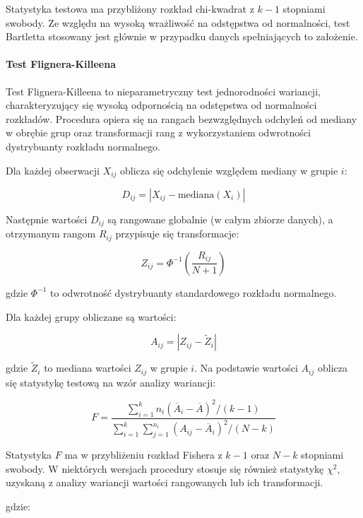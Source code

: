 \documentclass[12pt,a4paper]{article}
\begin{document}
Statystyka testowa ma przybliżony rozkład chi-kwadrat z $k - 1$ stopniami swobody. Ze względu na wysoką wrażliwość na odstępstwa od normalności, test Bartletta stosowany jest głównie w przypadku danych spełniających to założenie.

\newpage
\paragraph{Test Flignera-Killeena \cite{fligner1976distribution}}

Test Flignera-Killeena to nieparametryczny test jednorodności wariancji, charakteryzujący się wysoką odpornością na odstępstwa od normalności rozkładów. Procedura opiera się na rangach bezwzględnych odchyleń od mediany w obrębie grup oraz transformacji rang z wykorzystaniem odwrotności dystrybuanty rozkładu normalnego.

Dla każdej obserwacji $X_{ij}$ oblicza się odchylenie względem mediany w grupie $i$:

$$
D_{ij} = |X_{ij} - \text{mediana}(X_i)|
$$

Następnie wartości $D_{ij}$ są rangowane globalnie (w całym zbiorze danych), a otrzymanym rangom $R_{ij}$ przypisuje się transformacje:

$$
Z_{ij} = \Phi^{-1} \left( \frac{R_{ij}}{N + 1} \right)
$$

gdzie $\Phi^{-1}$ to odwrotność dystrybuanty standardowego rozkładu normalnego.

Dla każdej grupy obliczane są wartości:

$$
A_{ij} = |Z_{ij} - \tilde{Z}_i|
$$

gdzie $\tilde{Z}_i$ to mediana wartości $Z_{ij}$ w grupie $i$. Na podstawie wartości $A_{ij}$ oblicza się statystykę testową na wzór analizy wariancji:

$$
F = \frac{\sum_{i=1}^{k} n_i (\overline{A}_i - \overline{A})^2 / (k - 1)}{\sum_{i=1}^{k} \sum_{j=1}^{n_i} (A_{ij} - \overline{A}_i)^2 / (N - k)}
$$

Statystyka $F$ ma w przybliżeniu rozkład Fishera z $k - 1$ oraz $N - k$ stopniami swobody. W niektórych wersjach procedury stosuje się również statystykę $\chi^2$, uzyskaną z analizy wariancji wartości rangowanych lub ich transformacji.

gdzie:
\end{document}
